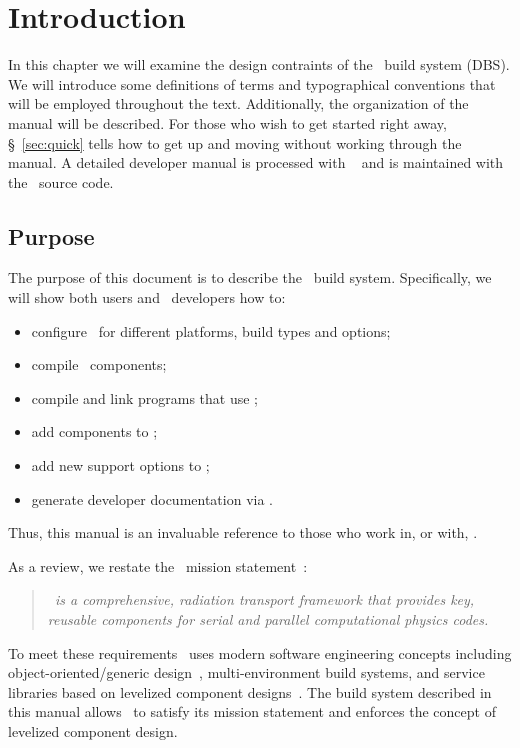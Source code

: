 
\chapter{Introduction}

In this chapter we will examine the %
design contraints of the \draco\ build system (DBS).  We will
introduce some definitions of terms and typographical conventions that
will be employed throughout the text.  Additionally, the organization
of the manual will be described.  For those who wish to get started
right away, \S~\ref{sec:quick} tells how to get up and moving without
working through the manual.  A detailed developer manual is processed
with ~\cite{doxygen} and is maintained with the
\draco\ source code.


\section{Purpose}
\label{sec:purpose}

The purpose of this document is to describe the \draco\ build system.
Specifically, we will show both users and \draco\ developers how to: 
\begin{itemize}
\item configure \draco\ for different platforms, build types and options; 
\item compile \draco\ components; 
\item compile and link programs that use \draco;
\item add components to \draco;
\item add new support options to \draco;
\item generate developer documentation via .
\end{itemize}
Thus, this manual is an invaluable reference to those who work in, or
with, \draco.

As a review, we restate the \draco\ mission statement~\cite{rn98046}:
\begin{quote}
  \slshape \draco\ is a comprehensive, radiation transport framework
  that provides key, reusable components for serial and parallel %
  computational physics codes.
\end{quote}  
To meet these requirements \draco\ uses modern software engineering
concepts including object-oriented/\-generic design~\cite{ooadid}, multi-environment
build systems, and service libraries based on levelized component
designs~\cite{la96}.  The build system described in this manual allows \draco\ to
satisfy its mission statement and enforces the concept of levelized
component design.

